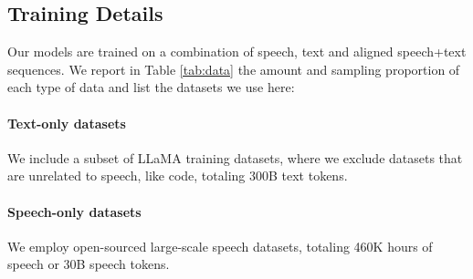 \subsection{Training Details}

Our \spot models are trained on a combination of speech, text and aligned speech+text sequences.  We report in Table \ref{tab:data} the amount and sampling proportion of each type of data and list the datasets we use here: 

\paragraph{Text-only datasets} We include a subset of LLaMA \citep{touvron2023llama} training datasets, 
where we exclude datasets that are unrelated to speech, like code, 
totaling 300B text tokens.

\paragraph{Speech-only datasets} We employ open-sourced large-scale speech datasets,
totaling 460K hours of speech or 30B speech tokens.

